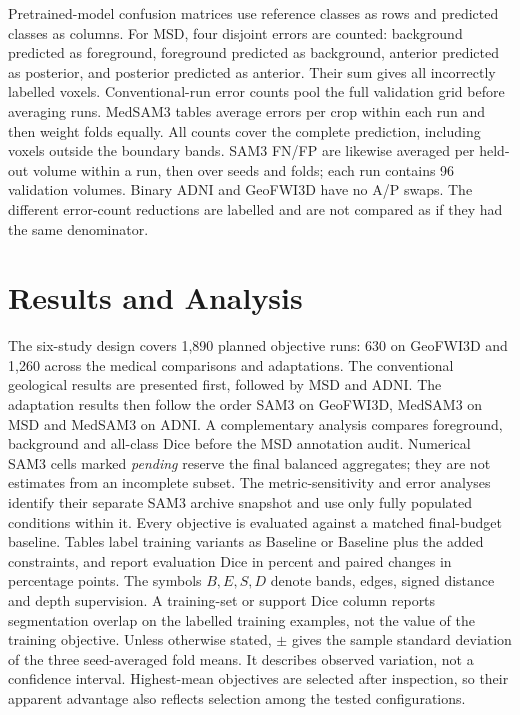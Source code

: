 \documentclass[12pt,a4paper]{article}
\begin{document}
Pretrained-model confusion matrices use reference classes as rows and
predicted classes as columns. For MSD, four disjoint errors are counted: background
predicted as foreground, foreground predicted as background, anterior
predicted as posterior, and posterior predicted as anterior. Their
sum gives all incorrectly labelled voxels. Conventional-run error counts pool the full validation grid before
averaging runs. MedSAM3 tables average errors per crop within each run
and then weight folds equally. All counts cover the complete prediction,
including voxels outside the boundary bands. SAM3 FN/FP are likewise
averaged per held-out volume within a run, then over seeds and folds;
each run contains 96 validation volumes. Binary ADNI and GeoFWI3D have
no A/P swaps. The different error-count reductions are labelled and are not compared
as if they had the same denominator.

\clearpage

\section{Results and Analysis}
\label{sec:results}

The six-study design covers 1,890 planned objective runs: 630 on
GeoFWI3D and 1,260 across the medical comparisons and adaptations.
The conventional geological results are presented first, followed by
MSD and ADNI. The adaptation results then follow the order SAM3 on
GeoFWI3D, MedSAM3 on MSD and MedSAM3 on ADNI. A complementary analysis compares
foreground, background and all-class Dice before the MSD annotation
audit. Numerical SAM3
cells marked \emph{pending} reserve the final balanced aggregates;
they are not estimates from an incomplete subset. The metric-sensitivity
and error analyses identify their separate SAM3 archive snapshot and
use only fully populated conditions within it. Every objective is evaluated against a matched final-budget baseline.
Tables label training variants as Baseline or Baseline plus the added
constraints, and report evaluation Dice in percent and paired changes
in percentage points. The symbols $B,E,S,D$ denote bands, edges,
signed distance and depth supervision. A training-set or support Dice
column reports segmentation overlap on the labelled training examples,
not the value of the training objective.
Unless otherwise stated, $\pm$ gives the sample standard deviation of
the three seed-averaged fold means. It describes observed variation,
not a confidence interval. Highest-mean objectives are selected after
inspection, so their apparent advantage also reflects selection among
the tested configurations.
\end{document}
